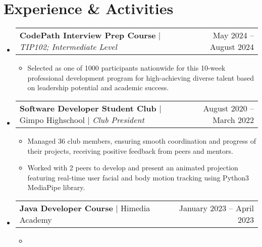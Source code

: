 \documentclass[letterpaper,11pt]{article}
\makeatletter
\newcommand{\resumeItem}[1]{
  \item\small{
    {#1 \vspace{-2pt}}
  }
}
\newcommand{\resumeProjectHeading}[2]{
    \item
    \begin{tabular*}{0.97\textwidth}{l@{\extracolsep{\fill}}r@{\hspace{-0.2in}}}
        \small#1 & #2 \\
    \end{tabular*}\vspace{-7pt}
}
\newcommand{\resumeSubHeadingListStart}{\begin{itemize}[leftmargin=0.00in, rightmargin=-0.2in, label={}]}
\newcommand{\resumeSubHeadingListEnd}{\end{itemize}}
\newcommand{\resumeItemListStart}{\begin{itemize}[leftmargin=0.15in]}
\newcommand{\resumeItemListEnd}{\end{itemize}\vspace{-5pt}}
\makeatother
\begin{document}

\section{Experience \& Activities}
    \resumeSubHeadingListStart
        \resumeProjectHeading
            {\textbf{CodePath Interview Prep Course} $|$ \emph{TIP102; Intermediate Level}}{May 2024 -- August 2024}
            \resumeItemListStart
                \resumeItem{Selected as one of 1000 participants nationwide for this 10-week professional development program for high-achieving diverse talent based on leadership potential and academic success.}
            \resumeItemListEnd
        \resumeSubHeadingListEnd

        \vspace*{-20pt}

    \resumeSubHeadingListStart
        \resumeProjectHeading
            {\textbf{Software Developer Student Club} $|$ Gimpo Highschool $|$ \emph{Club President}}{August 2020 -- March 2022}
            \resumeItemListStart
                \resumeItem{Managed 36 club members, ensuring smooth coordination and progress of their projects, receiving positive feedback from peers and mentors.}
                \resumeItem{Worked with 2 peers to develop and present an animated projection featuring real-time user facial and body motion tracking using Python3 MediaPipe library.}
            \resumeItemListEnd
        \resumeSubHeadingListEnd

        \vspace*{-20pt}

        \resumeSubHeadingListStart
        \resumeProjectHeading
            {\textbf{Java Developer Course} $|$ Himedia Academy}{January 2023 -- April 2023}
            \resumeItemListStart
                \resumeItem{}
            \resumeItemListEnd
        \resumeSubHeadingListEnd
\end{document}
